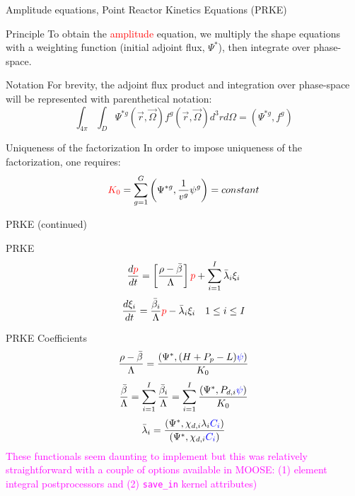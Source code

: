\documentclass[8pt]{beamer}
\newcommand{\tcr}[1]{\textcolor{red}{#1}}
\newcommand{\tcb}[1]{\textcolor{blue}{#1}}
\newcommand{\tcm}[1]{\textcolor{magenta}{#1}}
\begin{document}
\begin{frame}{Amplitude equations, Point Reactor Kinetics Equations (PRKE)}

\begin{block}{Principle}
To obtain the \tcr{amplitude} equation, we multiply the shape equations with a weighting 
function (initial adjoint flux, $\Psi^*$), then integrate over phase-space.  
\end{block}

\begin{block}{Notation}
For brevity, the adjoint flux product and integration over phase-space will be represented with parenthetical notation:
\[
\int_{4\pi}\int_D\Psi^{*g}(\vec{r},\vec{\Omega})f^g(\vec{r},\vec{\Omega})d^3rd\Omega=\left(\Psi^{*g},f^g\right)
\]
\end{block}


\begin{block}{Uniqueness of the factorization}
In order to impose uniqueness of the factorization, one requires:
\[
\tcr{K_0} = \sum_{g=1}^G\left(\Psi^{*g},\frac{1}{v^g}\psi^g\right)= constant
\]
\end{block}


\end{frame}

\begin{frame}{PRKE (continued)}

\begin{block}{PRKE}
\[
\frac{d\tcr{p}}{dt}=\left[\frac{\rho-\bar{\beta}}{\Lambda}\right]\tcr{p}+\sum_{i=1}^I\bar{\lambda}_i\xi_i
\]
\[
\frac{d\xi_i}{dt}=\frac{\bar{\beta}_i}{\Lambda}\tcr{p} - \bar{\lambda}_i\xi_i \quad 1 \le i \le I 
\]
\end{block}

\begin{block}{PRKE Coefficients}
\[
\frac{\rho-\bar{\beta}}{\Lambda}=
\frac{ \left( \Psi^{*}, (H+P_p-L) \tcb{\psi} \right)}{K_0}
\]
\[
\frac{\bar{\beta}}{\Lambda}=\sum_{i=1}^I\frac{\bar{\beta}_i}{\Lambda}=
\sum_{i=1}^I \frac{ \left(\Psi^{*}, P_{d,i} \tcb{\psi} \right)}{K_0}
\]
\[
\bar{\lambda}_i=\frac{(\Psi^{*},\chi_{d,i}\lambda_i \tcb{C_i})}{(\Psi^{*},\chi_{d,i}\tcb{C_i})}
\]
\tcm{These functionals seem daunting to implement but this was relatively straightforward with a couple of options available in MOOSE: (1) element integral postprocessors and (2) {\tt save\_in} kernel attributes)}
\end{block}

\end{frame}
\end{document}
